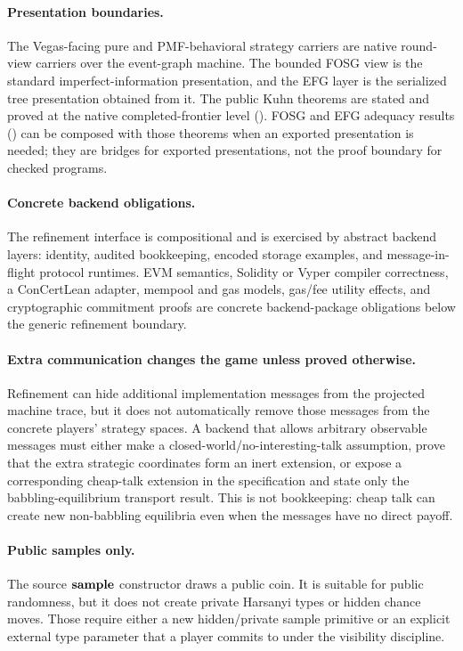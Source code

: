 \paragraph{Presentation boundaries.}  The Vegas-facing pure and
PMF-behavioral strategy carriers are native round-view carriers over the
event-graph machine.  The bounded FOSG view is the standard
imperfect-information presentation, and the EFG layer is the serialized
tree presentation obtained from it.  The public Kuhn theorems are stated
and proved at the native completed-frontier level
().
FOSG and EFG adequacy results
() can be composed with those theorems when an
exported presentation is needed; they are bridges for exported
presentations, not the proof boundary for checked programs.

\paragraph{Concrete backend obligations.}  The refinement interface is
compositional and is exercised by abstract backend layers: identity,
audited bookkeeping, encoded storage examples, and message-in-flight
protocol runtimes.  EVM semantics, Solidity or Vyper compiler
correctness, a ConCertLean adapter, mempool and gas models, gas/fee
utility effects, and cryptographic commitment proofs are concrete
backend-package obligations below the generic refinement boundary.

\paragraph{Extra communication changes the game unless proved otherwise.}
Refinement can hide additional implementation messages from the projected
machine trace, but it does not automatically remove those messages from
the concrete players' strategy spaces.  A backend that allows arbitrary
observable messages must either make a closed-world/no-interesting-talk
assumption, prove that the extra strategic coordinates form an inert
extension, or expose a corresponding cheap-talk extension in the
specification and state only the babbling-equilibrium transport result.
This is not bookkeeping: cheap talk can create new non-babbling
equilibria even when the messages have no direct payoff.

\paragraph{Public samples only.}  The source $\mathbf{sample}$ constructor
draws a public coin.  It is suitable for public randomness, but it
does not create private Harsanyi types or hidden chance moves.
Those require either a new hidden/private sample primitive or an
explicit external type parameter that a player commits to under the
visibility discipline.

